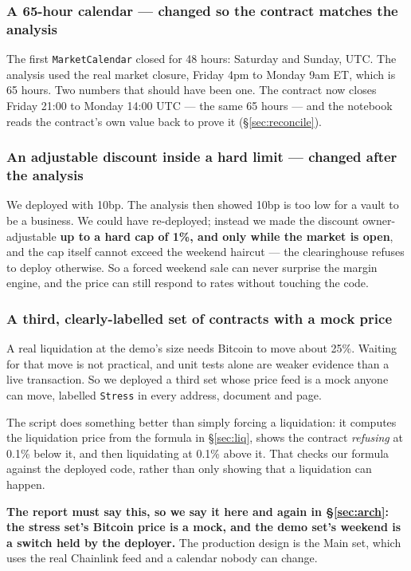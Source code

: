 \documentclass[11pt,a4paper]{article}
\newcommand{\cbox}[1]{%
  \begin{center}\colorbox{panel}{\parbox{0.95\textwidth}{\vspace{3pt}#1\vspace{3pt}}}\end{center}}
\begin{document}
\subsubsection{A 65-hour calendar — changed so the contract matches the analysis}

The first \texttt{MarketCalendar} closed for 48 hours: Saturday and Sunday, UTC. The analysis used
the real market closure, Friday 4pm to Monday 9am ET, which is 65 hours. Two numbers that should
have been one. The contract now closes Friday 21:00 to Monday 14:00 UTC — the same 65 hours — and
the notebook reads the contract's own value back to prove it (\S\ref{sec:reconcile}).

\subsubsection{An adjustable discount inside a hard limit — changed after the analysis}

We deployed with 10bp. The analysis then showed 10bp is too low for a vault to be a business. We
could have re-deployed; instead we made the discount owner-adjustable \textbf{up to a hard cap of
1\%, and only while the market is open}, and the cap itself cannot exceed the weekend haircut —
the clearinghouse refuses to deploy otherwise. So a forced weekend sale can never surprise the
margin engine, and the price can still respond to rates without touching the code.

\subsubsection{A third, clearly-labelled set of contracts with a mock price}

A real liquidation at the demo's size needs Bitcoin to move about 25\%. Waiting for that move is not
practical, and unit tests alone are weaker evidence than a live transaction. So we deployed a third set
whose price feed is a mock anyone can move, labelled \texttt{Stress} in every address, document and
page.

The script does something better than simply forcing a liquidation: it computes the liquidation
price from the formula in \S\ref{sec:liq}, shows the contract \emph{refusing} at 0.1\% below it, and
then liquidating at 0.1\% above it. That checks our formula against the deployed code, rather than
only showing that a liquidation can happen.

\cbox{\textbf{The report must say this, so we say it here and again in \S\ref{sec:arch}: the stress
set's Bitcoin price is a mock, and the demo set's weekend is a switch held by the deployer.} The
production design is the Main set, which uses the real Chainlink feed and a calendar nobody can
change.}
\end{document}
